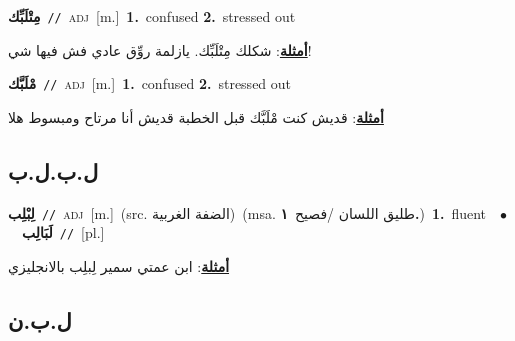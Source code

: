 \documentclass[10pt,a4paper,twoside]{article} %
\begin{document}
\begin{multicols}{2}
{\setlength\topsep{0pt}\textbf{\foreignlanguage{arabic}{مِتْلَبِّك}}\ {\color{gray}\texttt{//}\color{black}}\ \textsc{adj}\ [m.]\ \textbf{1.}~confused  \textbf{2.}~stressed out\  \begin{flushright}\color{gray}\foreignlanguage{arabic}{\textbf{\underline{\foreignlanguage{arabic}{أمثلة}}}: شكلك مِتْلَبِّك. يازلمة روِّق عادي فش فيها شي!}\end{flushright}\color{black}} \vspace{2mm}

{\setlength\topsep{0pt}\textbf{\foreignlanguage{arabic}{مْلَبَّك}}\ {\color{gray}\texttt{//}\color{black}}\ \textsc{adj}\ [m.]\ \textbf{1.}~confused  \textbf{2.}~stressed out\  \begin{flushright}\color{gray}\foreignlanguage{arabic}{\textbf{\underline{\foreignlanguage{arabic}{أمثلة}}}: قديش كنت مْلَبَّك قبل الخطبة قديش أنا مرتاح ومبسوط هلا}\end{flushright}\color{black}} \vspace{2mm}

\vspace{-3mm}
\subsection*{\color{blue}\foreignlanguage{arabic}{ل.ب.ل.ب}\color{blue}{}} 

{\setlength\topsep{0pt}\textbf{\foreignlanguage{arabic}{لِبْلِب}}\ {\color{gray}\texttt{//}\color{black}}\ \textsc{adj}\ [m.]\ (src. \color{gray}\foreignlanguage{arabic}{الضفة الغربية}\color{black})\ \color{gray}(msa. \foreignlanguage{arabic}{طليق اللسان /فصيح}~\foreignlanguage{arabic}{\textbf{١.}})\color{black}\ \textbf{1.}~fluent\ \ $\bullet$\ \ \setlength\topsep{0pt}\textbf{\foreignlanguage{arabic}{لَبَالِب}}\ {\color{gray}\texttt{//}\color{black}}\ [pl.]\  \begin{flushright}\color{gray}\foreignlanguage{arabic}{\textbf{\underline{\foreignlanguage{arabic}{أمثلة}}}: ابن عمتي سمير لِبلِب بالانجليزي}\end{flushright}\color{black}} \vspace{2mm}

\vspace{-3mm}
\subsection*{\color{blue}\foreignlanguage{arabic}{ل.ب.ن}\color{blue}{}} 


\end{multicols}
\end{document}
